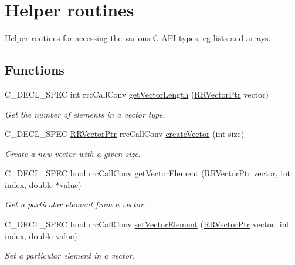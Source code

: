 \hypertarget{group__helper_routines}{}\section{Helper routines}
\label{group__helper_routines}


Helper routines for accessing the various C A\+P\+I types, eg lists and arrays.  


\subsection*{Functions}
\begin{DoxyCompactItemize}
\item 
C\+\_\+\+D\+E\+C\+L\+\_\+\+S\+P\+E\+C int rrc\+Call\+Conv \hyperlink{group__helper_routines_gaa54dd2d3c615bb2838c0670d0344e001}{get\+Vector\+Length} (\hyperlink{rrc__types_8h_a3be72d6006034fd349f753d2bf441bf7}{R\+R\+Vector\+Ptr} vector)
\begin{DoxyCompactList}\small\item\em Get the number of elements in a vector type. \end{DoxyCompactList}\item 
C\+\_\+\+D\+E\+C\+L\+\_\+\+S\+P\+E\+C \hyperlink{rrc__types_8h_a3be72d6006034fd349f753d2bf441bf7}{R\+R\+Vector\+Ptr} rrc\+Call\+Conv \hyperlink{group__helper_routines_ga9f52eab51dfe4dcd3d87538bf8ecd453}{create\+Vector} (int size)
\begin{DoxyCompactList}\small\item\em Create a new vector with a given size. \end{DoxyCompactList}\item 
C\+\_\+\+D\+E\+C\+L\+\_\+\+S\+P\+E\+C bool rrc\+Call\+Conv \hyperlink{group__helper_routines_ga859e5c6b606171f6a86311de2ee36ca6}{get\+Vector\+Element} (\hyperlink{rrc__types_8h_a3be72d6006034fd349f753d2bf441bf7}{R\+R\+Vector\+Ptr} vector, int index, double $\ast$value)
\begin{DoxyCompactList}\small\item\em Get a particular element from a vector. \end{DoxyCompactList}\item 
C\+\_\+\+D\+E\+C\+L\+\_\+\+S\+P\+E\+C bool rrc\+Call\+Conv \hyperlink{group__helper_routines_ga25a6d2f359f6a8fee529bc5c7e21ad9f}{set\+Vector\+Element} (\hyperlink{rrc__types_8h_a3be72d6006034fd349f753d2bf441bf7}{R\+R\+Vector\+Ptr} vector, int index, double value)
\begin{DoxyCompactList}\small\item\em Set a particular element in a vector. \end{DoxyCompactList}\item 

\end{DoxyCompactItemize}

